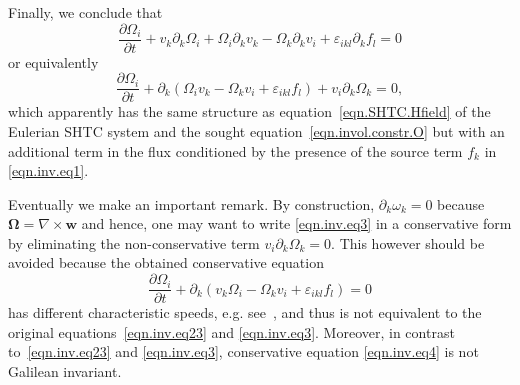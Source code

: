 \documentclass[twoside]{article}
\newcommand{\ww}{{\boldsymbol{w}}}
\newcommand{\pd}{\partial}
\newcommand{\eps}{\varepsilon}
\begin{document}
Finally, we conclude that 
\begin{equation}\label{eqn.inv.eq23}
\frac{\pd \Omega _i}{\pd t} + v_k\pd _k\Omega _i+\Omega _i\pd 
_k v_k - \Omega_k\pd_k v_i + \eps_{i k l} \pd_kf_l = 0 
\end{equation}
or equivalently
\begin{equation}\label{eqn.inv.eq3}
\frac{\pd \Omega _i}{\pd t} + \pd_k\left(\Omega_i v_k - \Omega_kv_i + \eps_{i k 
l} f_l \right) + v_i\pd_k\Omega_k = 0,
\end{equation}
which apparently has the same structure as equation~\eqref{eqn.SHTC.Hfield} of 
the Eulerian SHTC system and the sought equation~\eqref{eqn.invol.constr.O} but 
with an additional term in the flux conditioned by the presence of the source 
term $ f_k $ in \eqref{eqn.inv.eq1}.

Eventually we make an important remark. By construction, $ \pd_k\omega_k = 0 $ 
because $ \bm{\Omega} = \nabla\times\ww $ and hence, one may want to write 
\eqref{eqn.inv.eq3} in a conservative form by eliminating the 
non-conservative term $ v_i\pd_k\Omega_k = 0 $. This however should be avoided 
because the obtained conservative equation 
\begin{equation}\label{eqn.inv.eq4}
\frac{\pd \Omega _i}{\pd t} + \pd_k\left(v_k\Omega _i-\Omega _kv_i + \eps_{i k 
l} f_l \right) = 0
\end{equation}
has different characteristic speeds, e.g. see~\cite{Powell1999}, and thus is 
not equivalent to the original equations~\eqref{eqn.inv.eq23} and 
\eqref{eqn.inv.eq3}. Moreover, in contrast to~\eqref{eqn.inv.eq23} and 
\eqref{eqn.inv.eq3}, conservative equation \eqref{eqn.inv.eq4} is not Galilean 
invariant.

%

\end{document}
